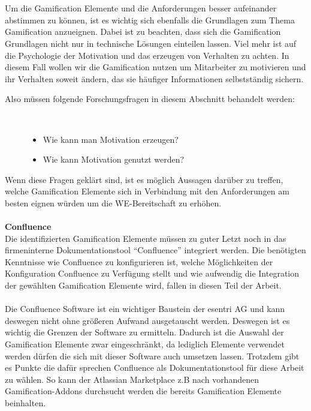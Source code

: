 \documentclass[a4paper,12pt]{scrartcl}
\begin{document}
\\\\
Um die Gamification Elemente und die Anforderungen besser aufeinander abstimmen zu können, ist es wichtig sich ebenfalls die Grundlagen zum Thema Gamification anzueignen. Dabei ist zu beachten, dass sich die Gamification Grundlagen nicht nur in technische Lösungen einteilen lassen. Viel mehr ist auf die Psychologie der Motivation und das erzeugen von Verhalten zu achten. In diesem Fall wollen wir die Gamification nutzen um Mitarbeiter zu motivieren und ihr Verhalten soweit ändern, das sie häufiger Informationen selbstständig sichern.
\begin{description}
   \item[Also müssen folgende Forschungsfragen in diesem Abschnitt behandelt werden:]~\par
   \begin{itemize}
      \item Wie kann man Motivation erzeugen?
      \item Wie kann Motivation genutzt werden?
   \end{itemize}
\end{description}
Wenn diese Fragen geklärt sind, ist es möglich Aussagen darüber zu treffen, welche Gamification Elemente sich in Verbindung mit den Anforderungen am besten eignen würden um die WE-Bereitschaft zu erhöhen.
\\\\
\textbf{Confluence}\\
Die identifizierten Gamification Elemente müssen zu guter Letzt noch in das firmeninterne Dokumentationstool \enquote{Confluence} integriert werden. Die benötigten Kenntnisse wie Confluence zu konfigurieren ist, welche Möglichkeiten der Konfiguration Confluence zu Verfügung stellt und wie aufwendig die Integration der gewählten Gamification Elemente wird, fallen in diesen Teil der Arbeit. 
\\\\
Die Confluence Software ist ein wichtiger Baustein der esentri AG und kann deswegen nicht ohne größeren Aufwand ausgetauscht werden. Deswegen ist es wichtig die Grenzen der Software zu ermitteln. Dadurch ist die Auswahl der Gamification Elemente zwar eingeschränkt, da lediglich Elemente verwendet werden dürfen die sich mit dieser Software auch umsetzen lassen. Trotzdem gibt es Punkte die dafür sprechen Confluence als Dokumentationstool für diese Arbeit zu wählen. So kann der Atlassian Marketplace z.B nach vorhandenen Gamification-Addons durchsucht werden die bereits Gamification Elemente beinhalten.
\end{document}
